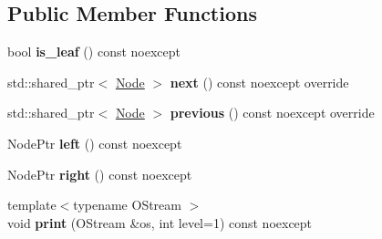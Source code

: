 \subsection*{Public Member Functions}
\begin{DoxyCompactItemize}
\item 
\mbox{\label{classBplusTree_1_1BplusNode_aa533f1a1ccceeccc83fe966d51611877}} 
bool {\bfseries is\+\_\+leaf} () const noexcept
\item 
\mbox{\label{classBplusTree_1_1BplusNode_ae5fa7de69c0ca98b025b0de31193d045}} 
std\+::shared\+\_\+ptr$<$ \hyperlink{classTree_1_1Node}{Node} $>$ {\bfseries next} () const noexcept override
\item 
\mbox{\label{classBplusTree_1_1BplusNode_ae232d00a45a87dd854b5e6fd65ef20f9}} 
std\+::shared\+\_\+ptr$<$ \hyperlink{classTree_1_1Node}{Node} $>$ {\bfseries previous} () const noexcept override
\item 
\mbox{\label{classBplusTree_1_1BplusNode_aef1ab31368c0247ddceb381bfd4ac144}} 
Node\+Ptr {\bfseries left} () const noexcept
\item 
\mbox{\label{classBplusTree_1_1BplusNode_aa36a1f5e2c7a911603f7abbb0159bdaf}} 
Node\+Ptr {\bfseries right} () const noexcept
\item 
\mbox{\label{classBplusTree_1_1BplusNode_aaf30bb552543a89d3041a7248fba37db}} 
{\footnotesize template$<$typename O\+Stream $>$ }\\void {\bfseries print} (O\+Stream \&os, int level=1) const noexcept
\end{DoxyCompactItemize}
